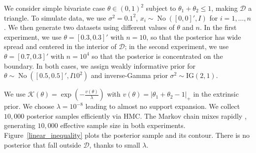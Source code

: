 \documentclass[10pt]{article}
\newcommand{\mc}[1]{\mathcal{#1}}
\DeclareMathOperator{\No}{No}
\DeclareMathOperator{\1}{\mathbbm{1}}
\begin{document}
We consider simple bivariate case $\theta \in (0,1)^2$ subject to $\theta_1+\theta_2\le 1$, making $\mc D$ a triangle. To simulate data, we use $\sigma^2=0.1^2$, $x_i\sim \No([0,0]',I)$ for $i=1,\ldots,n$. We then generate two datasets using different values of $\theta$ and $n$. In the first experiment, we use $\theta=[0.3,0.3]'$ with $n=10$, so that the posterior has wide spread and centered in the interior of $\mc D$; in the second experiment, we use $\theta=[0.7,0.3]'$ with $n=10^4$ so that the posterior is concentrated on the boundary. In both cases, we assign weakly informative prior for $\theta\sim \No([0.5, 0.5]',I10^2)$ and inverse-Gamma prior $\sigma^2\sim \text{IG}(2,1)$.

We use $\mc K(\theta)=\exp( - \frac{v(\theta)}{\lambda})$ with $v(\theta)=|\theta_1+\theta_2-1|_{+}$ in the extrinsic prior. We choose $\lambda=10^{-8}$ leading to almost no support expansion. We collect $10,000$ posterior samples efficiently via HMC. The Markov chain mixes rapidly , generating $10,000$ effective sample size in both experiments. Figure~\ref{linear_inequality} plots the posterior sample and its contour. There is no posterior that fall outside $\mc D$, thanks to small $\lambda$.
\end{document}
